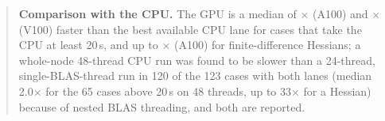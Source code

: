\begin{abstract}
\noindent\textbf{Comparison with the CPU.} The GPU is a median of \CPUMedBestAHund$\times$ (A100) and \CPUMedBestVHund$\times$ (V100) faster than the best available CPU lane for cases that take the CPU at least 20\,s, and up to \CPUMaxBestAHund$\times$ (A100) for finite-difference Hessians; a whole-node 48-thread CPU run was found to be slower than a 24-thread, single-BLAS-thread run in 120 of the 123 cases with both lanes (median 2.0$\times$ for the 65 cases above 20\,s on 48 threads, up to 33$\times$ for a Hessian) because of nested BLAS threading, and both are reported.
\end{abstract}

